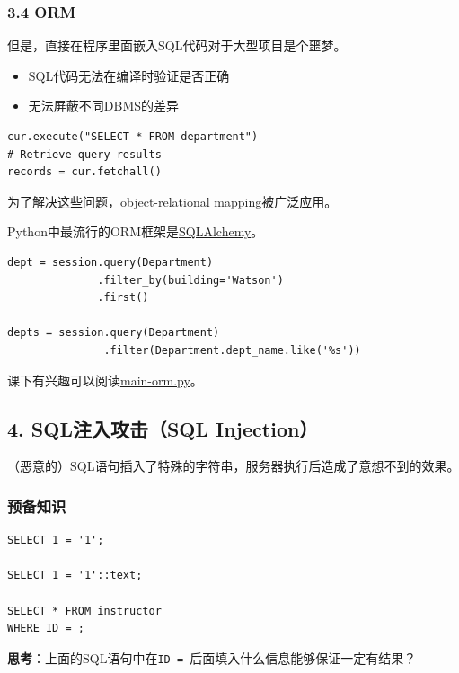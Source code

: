 \documentclass[aspectratio=169, 14pt]{beamer}
\begin{document}
\begin{frame}[fragile]
    \frametitle{3.4 ORM}
但是，直接在程序里面嵌入SQL代码对于大型项目是个噩梦。

\begin{itemize}
    \item SQL代码无法在编译时验证是否正确
    \item 无法屏蔽不同DBMS的差异
\end{itemize}


\begin{verbatim}
cur.execute("SELECT * FROM department")
# Retrieve query results
records = cur.fetchall()
\end{verbatim}

为了解决这些问题，object-relational mapping被广泛应用。
\end{frame}

\begin{frame}[fragile]
Python中最流行的ORM框架是\href{https://www.sqlalchemy.org/}{SQLAlchemy}。


\begin{verbatim}
dept = session.query(Department)
              .filter_by(building='Watson')
              .first()

depts = session.query(Department)
               .filter(Department.dept_name.like('%s'))
\end{verbatim}

课下有兴趣可以阅读\href{https://github.com/ChenZhongPu/db-swufe/blob/master/10_advanced/python-orm/main-orm.py}{main-orm.py}。
\end{frame}

\begin{frame}[fragile]
    \section{\textcolor{darkmidnightblue}{4. SQL注入攻击（SQL Injection）}}
    （恶意的）SQL语句插入了特殊的字符串，服务器执行后造成了意想不到的效果。
\end{frame}

\begin{frame}[fragile]
    \frametitle{预备知识}

    \begin{verbatim}
SELECT 1 = '1';

SELECT 1 = '1'::text;

SELECT * FROM instructor
WHERE ID = ;
    \end{verbatim}
 \textbf{思考}：上面的SQL语句中在\texttt{ID = }后面填入什么信息能够保证一定有结果？
\end{frame}
\end{document}
